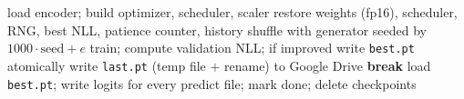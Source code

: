 \documentclass[11pt,a4paper]{article}
\theoremstyle{remark}
\begin{document}
\begin{algorithm}[h]
\caption{Resumable run on a free GPU (one encoder, one learning rate)}
\label{alg:resume}
\small
\begin{algorithmic}[1]
 \State \Return {}\EndIf
\State load encoder; build optimizer, scheduler, scaler
 \State restore weights (fp16), scheduler, RNG, best NLL, patience counter, history \EndIf
{}
  \State shuffle with generator seeded by $1000\cdot\text{seed}+e$ 
  \State train; compute validation NLL; if improved write \texttt{best.pt}
  \State atomically write \texttt{last.pt} (temp file $+$ rename) to Google Drive
   \textbf{break} \EndIf
\EndFor
\State load \texttt{best.pt}; write logits for every predict file; mark done; delete checkpoints
\end{algorithmic}
\end{algorithm}
\end{document}
